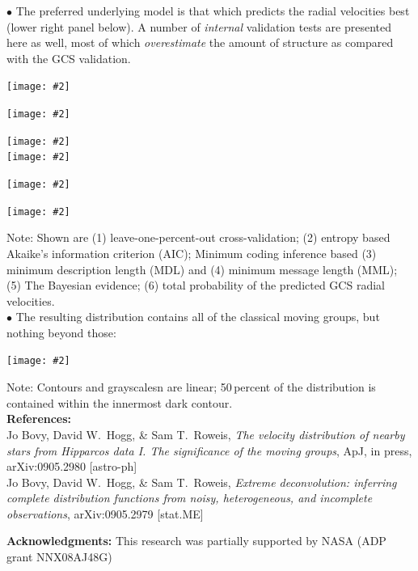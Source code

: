 \documentclass[portrait,a0b,final]{a0poster}
\newcommand{\myfig}[3][0]{
  \texttt{[image: \#2]}
}
\newcommand{\mycaption}[1]{
  \vspace{0.5cm}
  \begin{quote}
    {{\sc Figure} \arabic{figure}: #1}
  \end{quote}
  \vspace{1cm}
  \stepcounter{figure}
}
\begin{document}
\begin{multicols}{2}
{\Large $\bullet$ The preferred underlying model is that which
predicts the radial velocities best (lower right panel below). A
number of \emph{internal} validation tests are presented here as well,
most of which \emph{overestimate} the amount of structure as compared
with the GCS validation.}
\begin{center}
  \myfig{crossval.ps}{0.31}
  \myfig{aic.ps}{0.31}
  \myfig{mdl.ps}{0.31}\\[.7cm]
  \myfig{mml.ps}{0.31}
  \myfig{bayes.ps}{0.31}
  \myfig{gcs_cross.ps}{0.31}\\[1cm]
\end{center}
Note: Shown are (1) leave-one-percent-out cross-validation; (2) entropy
based Akaike's information criterion (AIC); Minimum coding inference
based (3) minimum description length (MDL) and (4) minimum message
length (MML); (5) The Bayesian evidence; (6) total probability of the
predicted GCS radial velocities.\\[.5cm]



{\Large $\bullet$ The resulting distribution contains all of the classical moving groups, but nothing beyond those:}
\begin{center}
  \myfig{annotated_veldist.ps}{1}%
\end{center}
Note: Contours and grayscalesn are linear; 50\,percent of the
distribution is contained within the innermost dark contour.\\[.2cm]

{\large {\bf References:\\} 
Jo Bovy, David W.~Hogg, \& Sam T.~Roweis, \emph{The velocity distribution of nearby stars from \emph{Hipparcos} data I. The significance of the moving groups}, ApJ, in press, arXiv:0905.2980 [astro-ph]\\
Jo Bovy, David W.~Hogg, \& Sam T.~Roweis, \emph{Extreme deconvolution: inferring complete distribution functions from noisy, heterogeneous, and incomplete observations}, arXiv:0905.2979 [stat.ME]\\[1.5cm]
}

{\large {\bf Acknowledgments:} This research was partially supported by NASA (ADP grant NNX08AJ48G)}\\[1cm]

\end{multicols}

\end{document}
